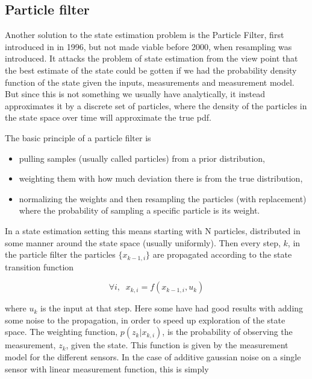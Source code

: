 \subsection{Particle filter}
Another solution to the state estimation problem is the Particle Filter, first introduced in \cite{ParticleFilter} in 1996, but not made viable before 2000, when resampling was introduced\cite{ParticleResampling}. It attacks the problem of state estimation from the view point that the best estimate of the state could be gotten if we had the probability density function of the state given the inputs, measurements and measurement model. But since this is not something we usually have analytically, it instead approximates it by a discrete set of particles, where the density of the particles in the state space over time will approximate the true pdf. 

The basic principle of a particle filter is 

\begin{itemize}
    \item pulling samples (usually called particles) from a prior distribution, 
    \item weighting them with how much deviation there is from the true distribution, 
    \item normalizing the weights and then resampling the particles (with replacement) where the probability of sampling a specific particle is its weight. 
\end{itemize}

In a state estimation setting this means starting with N particles, distributed in some manner around the state space (usually uniformly). Then every step, $k$, in the particle filter the particles $\{x_{k-1,i}\}$ are propagated according to the state transition function

\begin{equation}
\forall i, \; \; x_{k,i} = f(x_{k-1,i}, u_k)
\end{equation}

where $u_k$ is the input at that step. Here some have had good results with adding some noise to the propagation, in order to speed up exploration of the state space\cite{ParticleNoise}. The weighting function, $p(z_k|x_{k,i})$, is the probability of observing the measurement, $z_k$, given the state. This function is given by the measurement model for the different sensors. In the case of additive gaussian noise on a single sensor with linear measurement function, this is simply

